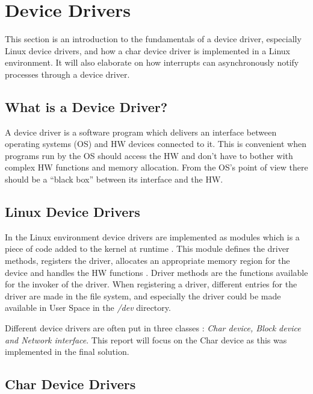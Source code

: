 
\section{Device Drivers}

This section is an introduction to the fundamentals of a device driver, especially Linux device drivers, and how a char device driver is implemented in a Linux environment. It will also elaborate on how interrupts can asynchronously notify processes through a device driver.

\subsection{What is a Device Driver?}

A device driver \cite{devicedriver} is a software program which delivers an interface between operating systems (OS) and HW devices connected to it. This is convenient when programs run by the OS should access the HW and don't have to bother with complex HW functions and memory allocation. From the OS's point of view there should be a ``black box'' between its interface and the HW.

\subsection{Linux Device Drivers}

In the Linux environment device drivers are implemented as modules which is a piece of code added to the kernel at runtime \cite{module}. This module defines the driver methods, registers the driver, allocates an appropriate memory region for the device and handles the HW functions \cite{ch3}. Driver methods are the functions available for the invoker of the driver. When registering a driver, different entries for the driver are made in the file system, and especially the driver could be made available in User Space in the \emph{/dev} directory.

Different device drivers are often put in three classes \cite{classes}: \emph{Char device, Block device and Network interface}. This report will focus on the Char device as this was implemented in the final solution. 

\subsection{Char Device Drivers}

